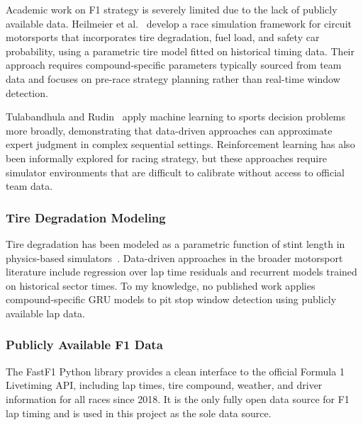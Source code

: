 Academic work on F1 strategy is severely limited due to the lack of publicly available data. Heilmeier et al.~\cite{heilmeier2020} develop a race simulation framework for circuit motorsports that incorporates tire degradation, fuel load, and safety car probability, using a parametric tire model fitted on historical timing data. Their approach requires compound-specific parameters typically sourced from team data and focuses on pre-race strategy planning rather than real-time window detection.

Tulabandhula and Rudin~\cite{tulabandhula2014} apply machine learning to sports decision problems more broadly, demonstrating that data-driven approaches can approximate expert judgment in complex sequential settings. Reinforcement learning has also been informally explored for racing strategy, but these approaches require simulator environments that are difficult to calibrate without access to official team data.

\subsubsection{Tire Degradation Modeling}

Tire degradation has been modeled as a parametric function of stint length in physics-based simulators~\cite{heilmeier2020}. Data-driven approaches in the broader motorsport literature include regression over lap time residuals and recurrent models trained on historical sector times. To my knowledge, no published work applies compound-specific GRU models to pit stop window detection using publicly available lap data.

\subsubsection{Publicly Available F1 Data}

The FastF1 Python library \cite{fastf1} provides a clean interface to the official Formula 1 Livetiming API, including lap times, tire compound, weather, and driver information for all races since 2018. It is the only fully open data source for F1 lap timing and is used in this project as the sole data source.
